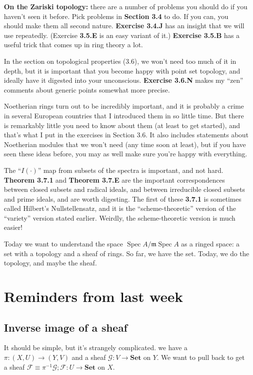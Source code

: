 \documentclass{book}
\newcommand{\F}{\ensuremath{\mathcal{F}}}
\newcommand{\G}{\ensuremath{\mathcal{G}}}
\newcommand{\spec}{\operatorname{Spec}}
\newcommand{\m}{\mathfrak{m}}
\newcommand{\mspec}{\m\operatorname{Spec}}
\newcommand{\Set}{\ensuremath{\mathbf{Set}}}
\theoremstyle{definition}
\begin{document}
\begin{itemize}
    \textbf{On the Zariski topology:} there are a number of problems you should do if you
    haven’t seen it before. Pick problems in \textbf{Section 3.4} to do.
    If you can, you should make them all second nature. \textbf{Exercise 3.4.J}
    has an insight that we will use repeatedly. (Exercise \textbf{3.5.E} is an
    easy variant of it.) \textbf{Exercise 3.5.B} has a useful trick that comes
    up in ring theory a lot.

    In the section on topological properties (3.6), we won’t need too much of it in
    depth, but it is important that you become happy with point set topology, and
    ideally have it digested into your unconscious. \textbf{Exercise 3.6.N} makes my ``zen''
    comments about generic points somewhat more precise.

    Noetherian rings turn out to be incredibly important, and it is probably a
    crime in several European countries that I introduced them in so little
    time. But there is remarkably little you need to know about them (at least
    to get started), and that’s what I put in the exercises in Section 3.6. It
    also includes statements about Noetherian modules that we won’t need (any
    time soon at least), but if you have seen these ideas before, you may as
    well make sure you’re happy with everything.

    The ``$I(\cdot)$'' map from subsets of the spectra is important, and not hard.
    \textbf{Theorem 3.7.1} and \textbf{Theorem 3.7.E} are the important
    correspondences between closed subsets and radical ideals, and between
    irreducible closed subsets and prime ideals, and are worth digesting. The first
    of these \textbf{3.7.1} is sometimes called Hilbert’s Nullstellensatz, and
    it is the ``scheme-theoretic'' version of the ``variety'' version stated
    earlier. Weirdly, the scheme-theoretic version is much easier!
\end{itemize}

Today we want to understand the space $\spec A / \mspec A$
as a ringed space: a set with a topology and a
sheaf of rings. So far, we have the set.
Today, we do the topology, and maybe the sheaf.

\section{Reminders from last week}
\subsection{Inverse image of a sheaf}
It should be simple, but it's strangely complicated.
we have a $\pi: (X, U) \rightarrow (Y, V)$ and a sheaf
$\G: V \rightarrow \Set$ on $Y$. We want to pull back to get
a sheaf $\F \equiv \pi^{-1}\G; \F : U \rightarrow \Set$ on $X$.
\end{document}
